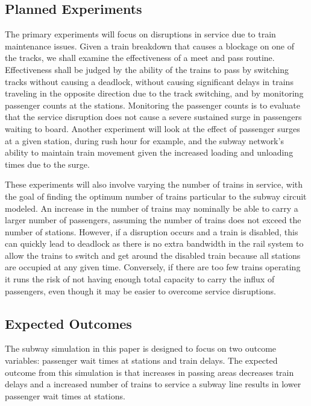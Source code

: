 \subsection{Planned Experiments}\label{section:experiment_setup}
The primary experiments will focus on disruptions in service due to train maintenance issues.  Given a train breakdown that causes a blockage on one of the tracks, we shall examine the effectiveness of a meet and pass routine.  Effectiveness shall be judged by the ability of the trains to pass by switching tracks without causing a deadlock, without causing significant delays in trains traveling in the opposite direction due to the track switching, and by monitoring passenger counts at the stations.  Monitoring the passenger counts is to evaluate that the service disruption does not cause a severe sustained surge in passengers waiting to board.  Another experiment will look at the effect of passenger surges at a given station, during rush hour for example, and the subway network's ability to maintain train movement given the increased loading and unloading times due to the surge. 

These experiments will also involve varying the number of trains in service, with the goal of finding the optimum number of trains particular to the subway circuit modeled.  An increase in the number of trains may nominally be able to carry a larger number of passengers, assuming the number of trains does not exceed the number of stations.  However, if a disruption occurs and a train is disabled, this can quickly lead to deadlock as there is no extra bandwidth in the rail system to allow the trains to switch and get around the disabled train because all stations are occupied at any given time.  Conversely, if there are too few trains operating it runs the risk of not having enough total capacity to carry the influx of passengers, even though it may be easier to overcome service disruptions.

\subsection{Expected Outcomes}

The subway simulation in this paper is designed to focus on two outcome variables: passenger wait times at stations and train delays. The expected outcome from this simulation is that increases in passing areas decreases train delays and a increased number of trains to service a subway line results in lower passenger wait times at stations.
